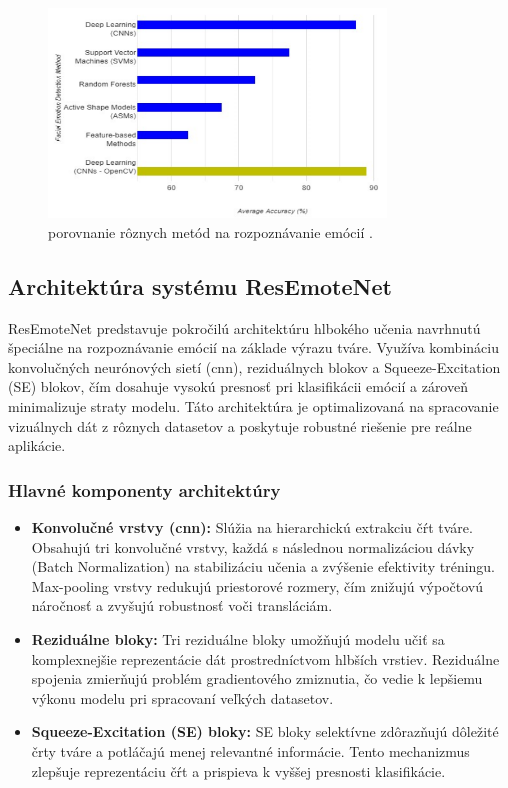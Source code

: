 \begin{figure}[!htpb]
    \centering
    \includegraphics[width=0.8\textwidth]{img/comparation.png}
    \caption{porovnanie rôznych metód na rozpoznávanie emócií \cite{inProceedings02}.}
    \label{fig:comparation}
\end{figure}
\newpage
\subsection{Architektúra systému ResEmoteNet}

ResEmoteNet predstavuje pokročilú architektúru hlbokého učenia navrhnutú špeciálne na rozpoznávanie emócií na základe výrazu tváre. Využíva kombináciu konvolučných neurónových sietí (\gls{cnn}), reziduálnych blokov a Squeeze-Excitation (SE) blokov, čím dosahuje vysokú presnosť pri klasifikácii emócií a zároveň minimalizuje straty modelu. Táto architektúra je optimalizovaná na spracovanie vizuálnych dát z rôznych datasetov a poskytuje robustné riešenie pre reálne aplikácie.

\subsubsection{Hlavné komponenty architektúry}

\begin{itemize}
    \item \textbf{Konvolučné vrstvy (\gls{cnn}):} 
    Slúžia na hierarchickú extrakciu čŕt tváre. Obsahujú tri konvolučné vrstvy, každá s následnou normalizáciou dávky (Batch Normalization) na stabilizáciu učenia a zvýšenie efektivity tréningu. Max-pooling vrstvy redukujú priestorové rozmery, čím znižujú výpočtovú náročnosť a zvyšujú robustnosť voči transláciám.
    
    \item \textbf{Reziduálne bloky:} 
    Tri reziduálne bloky umožňujú modelu učiť sa komplexnejšie reprezentácie dát prostredníctvom hlbších vrstiev. Reziduálne spojenia zmierňujú problém gradientového zmiznutia, čo vedie k lepšiemu výkonu modelu pri spracovaní veľkých datasetov.
    
    \item \textbf{Squeeze-Excitation (SE) bloky:} 
    SE bloky selektívne zdôrazňujú dôležité črty tváre a potláčajú menej relevantné informácie. Tento mechanizmus zlepšuje reprezentáciu čŕt a prispieva k vyššej presnosti klasifikácie.
\end{itemize}

